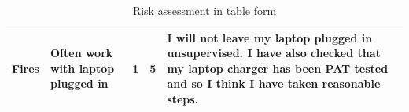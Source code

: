 \documentclass[12pt,onecolumn,letterpaper]{article}
\begin{document}
\begin{table}[!htbp]
{{\begin{tabular}{|p{1.2cm}|p{1.5cm}|p{1.3cm}|p{1.2cm}|p{7cm}|}
Fires                          & Often work with laptop plugged in & 1                        & 5                           & I will not leave my laptop plugged in unsupervised. I have also checked that my laptop charger has been PAT tested and so I think I have taken reasonable steps.                                                                                                               \\ \hline
\end{tabular}
}}
\caption{Risk assessment in table form}
\label{tab:RiskAssessment}
\end{table}


{\small


}
\end{document}
